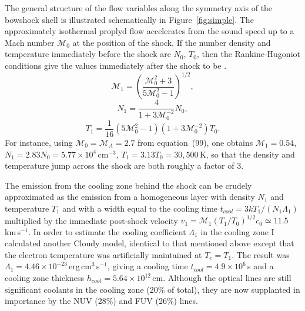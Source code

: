 \documentclass[11pt,proc,twoside]{RMxAC_rho-class/RMxAC_rho}
\begin{document}
The general structure of the flow variables along the symmetry axis of
the bowshock shell is illustrated schematically in
Figure~\ref{fig:simple}.  The approximately isothermal proplyd flow
accelerates from the sound speed up to a Mach number $\mathcal{M}_0$
at the position of the shock. If the number density and temperature
immediately before the shock are $N_0$, $T_0$, then the
Rankine-Hugoniot conditions give the values immediately after
the shock to be \citep{1987flme.book.....L}. %
\begin{equation}
  \label{eq:mjump}
  \mathcal{M}_1 = \left( \frac{ \mathcal{M}_0^2 + 3 } { 5
      \mathcal{M}_0^2 - 1 } \right)^{1/2} , 
\end{equation}
\begin{equation}
  \label{eq:njump}
  N_1 = \frac{ 4 } { 1 + 3 \mathcal{M}_0^{-2} } N_0 , 
\end{equation}
\begin{equation}
  \label{eq:tjump}
  T_1 = \frac{1}{16} \left( 5 \mathcal{M}_0^2 - 1 \right) 
  \left( 1 + 3 \mathcal{M}_0^{-2} \right) T_0 .
\end{equation}
For instance, using $\mathcal{M}_0 = \mathcal{M}_{A} = 2.7$ from
equation~(99), one obtains $\mathcal{M}_1 = 0.54$,
$N_1 = 2.83 N_0 = 5.77 \times 10^4$\,cm$^{-3}$, $T_1 = 3.13 T_0 =
30,500$\,K, so that the density and temperature jump across the shock
are both roughly a factor of 3.

The emission from the cooling zone behind the shock can be crudely
approximated as the emission from a homogeneous layer with density
$N_1$ and temperature $T_1$ and with a width equal to the cooling time
$t_{cool} = 3 k T_1 / \left( N_1 \Lambda_1 \right)$ multiplied by
the immediate post-shock velocity $v_1 = \mathcal{M}_1 (T_1/T_0)^{1/2}
c_0 \simeq 11.5$\,km\,s$^{-1}$. In order to estimate the cooling
coefficient $\Lambda_1$ in the cooling zone I calculated another
Cloudy model, identical to that mentioned above except that the
electron temperature was artificially maintained at $T_{e} = T_1$.
The result was $\Lambda_1 = 4.46 \times
10^{-23}$\,erg\,cm$^{3}$\,s$^{-1}$, giving a cooling time $t_{cool} =
4.9 \times 10^6$\,s and a cooling zone thickness $h_{cool} = 5.64
\times 10^{12}$\,cm. Although the  optical lines are still
significant coolants in the cooling zone (20\% of total), they are now
supplanted in importance by the  NUV (28\%) and FUV (26\%)
lines.
\end{document}
